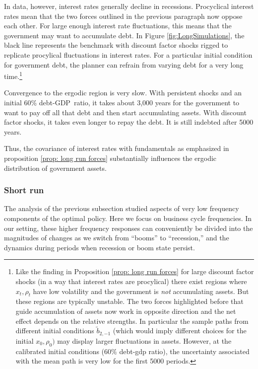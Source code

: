 \documentclass[thmsb,11pt]{article}
\begin{document}
{In data, however, interest rates  generally decline in recessions. Procyclical interest rates mean that the
two forces outlined in the previous paragraph now oppose each other.  For  large enough interest rate fluctuations, this means that
the
government may want to accumulate debt. In Figure \ref{fig:LongSimulations}, the
black line represents the benchmark with discount factor shocks rigged to
replicate  procylical fluctuations in interest rates. For a particular initial condition for government debt,
the planner can refrain from varying debt for a very  long time.\footnote{Like the finding in Proposition \ref{prop: long run forces} for large discount factor shocks (in a way that interest rates are procylical)  there exist
regions where $x_t,\rho_t$ have low volatility and the  government is \emph{not} accumulating assets. But these
regions  are typically unstable. The two forces highlighted before that guide accumulation of assets now work in opposite direction and the net effect depends
on the relative strengths. In particular the sample paths from different initial conditions $\tilde{b}_{2,-1}$ (which would imply different choices for the initial $x_0,\rho_0)$ may display larger fluctuations in assets. However, at the calibrated initial conditions ($60\%$ debt-gdp ratio), the uncertainty associated with the mean path is very low for the first 5000 periods.}


Convergence to the ergodic region is  very slow.  With persistent shocks and an initial 60\% debt-GDP\ ratio,  it takes about 3,000 years for
the government to want to pay off all that debt
and then start accumulating assets. With
discount factor shocks, it takes even longer to repay the debt. It is still indebted after 5000 years.

Thus, the covariance of interest rates with fundamentals as emphasized in proposition \ref{prop: long run forces} substantially influences the ergodic distribution of government assets.

\subsubsection{Short run}

The analysis of the previous subsection studied  aspects of very low
frequency components of  the optimal policy. Here  we focus on business cycle frequencies.
 In our setting,  these higher frequency responses can conveniently be divided  into the magnitudes of changes as we switch from ``booms''
to ``recession,'' and the dynamics during  periods when recession or boom state persist.

}
\end{document}
